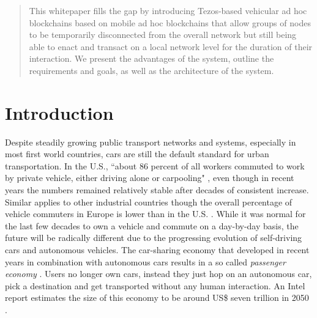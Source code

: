 \documentclass{llncs}
\begin{document}
{\begin{abstract}
		This whitepaper fills the gap by introducing Tezos-based vehicular ad hoc blockchains based on mobile ad hoc blockchains that allow groups of nodes to be temporarily disconnected from the overall network but still being able to enact and transact on a local network level for the duration of their interaction. We present the advantages of the system, outline the requirements and goals, as well as the architecture of the system.



	\end{abstract}
	
	

	
	\section{Introduction}
		\label{s:introduction}

		Despite steadily growing public transport networks and systems, especially in most first world countries, cars are still the default standard for urban transportation. In the U.S., ``about 86 percent of all workers commuted to work by private vehicle, either driving alone or carpooling" \cite{mckenzie2015drives}, even though in recent years the numbers remained relatively stable after decades of consistent increase. Similar applies to other industrial countries \cite{netherlandsPublicTransport}\cite{zealand2006car} though the overall percentage of vehicle commuters in Europe is lower than in the U.S. \cite{commuteUSvsEurope}. While it was normal for the last few decades to own a vehicle and commute on a day-by-day basis, the future will be radically different due to the progressing evolution of self-driving cars and autonomous vehicles. The car-sharing economy that developed in recent years in combination with autonomous cars results in a so called \textit{passenger economy} \cite{intelPassengerEconomy}. Users no longer own cars, instead they just hop on an autonomous car, pick a destination and get transported without any human interaction. An Intel report estimates the size of this economy to be around US\$ seven trillion in 2050 \cite{intelPassengerEconomy}.

}
\end{document}
